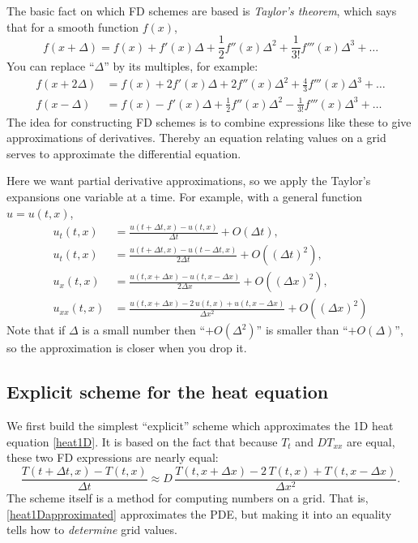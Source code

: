 \documentclass[letterpaper,final,12pt,reqno]{amsart}
\begin{document}
The basic fact on which FD schemes are based is \emph{Taylor's theorem}, which says that for a smooth function $f(x)$,
	$$f(x+\Delta) = f(x) + f'(x) \Delta + \frac{1}{2} f''(x) \Delta^2 + \frac{1}{3!} f'''(x) \Delta^3 + \dots$$
You can replace ``$\Delta$'' by its multiples, for example:
\begin{align*}
f(x+2\Delta) &= f(x) + 2 f'(x) \Delta + 2 f''(x) \Delta^2 + \frac{4}{3} f'''(x) \Delta^3 + \dots \\
f(x-\Delta) &= f(x) - f'(x) \Delta + \frac{1}{2} f''(x) \Delta^2 - \frac{1}{3!} f'''(x) \Delta^3 + \dots
\end{align*}
The idea for constructing FD schemes is to combine expressions like these to give approximations of derivatives.  Thereby an equation relating values on a grid serves to approximate the differential equation.

Here we want partial derivative approximations, so we apply the Taylor's expansions one variable at a time.  For example, with a general function $u=u(t,x)$,
\begin{align*}
u_t(t,x) &= \frac{u(t+\Delta t,x) - u(t,x)}{\Delta t} + O(\Delta t), \\
u_t(t,x) &= \frac{u(t+\Delta t,x) - u(t-\Delta t,x)}{2\Delta t} + O((\Delta t)^2), \\
u_x(t,x) &= \frac{u(t,x+\Delta x) - u(t,x-\Delta x)}{2\Delta x} + O((\Delta x)^2), \\
u_{xx}(t,x) &= \frac{u(t,x+\Delta x) - 2\, u(t,x) + u(t,x-\Delta x)}{\Delta x^2} + O((\Delta x)^2)
\end{align*}
Note that if $\Delta$ is a small number then ``$+O(\Delta^2)$'' is smaller than ``$+O(\Delta)$'', so the approximation is closer when you drop it.

\subsection*{Explicit scheme for the heat equation}  We first build the simplest ``explicit'' scheme which approximates the 1D heat equation \eqref{heat1D}.  It is based on the fact that because $T_t$ and $D T_{xx}$ are equal, these two FD expressions are nearly equal:
\begin{equation}
\frac{T(t+\Delta t,x) - T(t,x)}{\Delta t} \approx D\,\frac{T(t,x+\Delta x) - 2\, T(t,x) + T(t,x-\Delta x)}{\Delta x^2}.  \label{heat1Dapproximated}
\end{equation}
The scheme itself is a method for computing numbers on a grid.  That is, \eqref{heat1Dapproximated} approximates the PDE, but making it into an equality tells how to \emph{determine} grid values.
\end{document}
